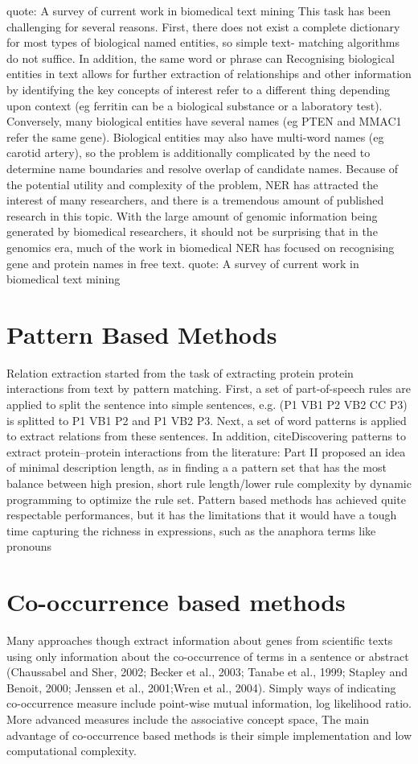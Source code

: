 quote: A survey of current work in biomedical text mining
This task has been challenging for several reasons. First, there does not exist a complete dictionary for most types of biological named entities, so simple text- matching algorithms do not suffice. In addition, the same word or phrase can
Recognising biological entities in text allows for further extraction of relationships and other information by identifying the key concepts of interest
refer to a different thing depending upon context (eg ferritin can be a biological substance or a laboratory test). Conversely, many biological entities have several names (eg PTEN and MMAC1 refer the same gene). Biological entities may also have multi-word names (eg carotid artery), so the problem is additionally complicated by the need to determine name boundaries and resolve overlap of candidate names.
Because of the potential utility and complexity of the problem, NER has attracted the interest of many researchers, and there is a tremendous amount of published research in this topic. With the large amount of genomic information being generated by biomedical researchers, it should not be surprising that in the genomics era, much of the work in biomedical NER has focused on recognising gene and protein names in free text.
quote: A survey of current work in biomedical text mining
\section{Pattern Based Methods}
Relation extraction started from the task of extracting protein protein interactions from text by pattern matching. 
First, a set of part-of-speech rules are applied to split the sentence into simple sentences, e.g. (P1 VB1 P2 VB2 CC P3) is splitted to P1 VB1 P2 and P1 VB2 P3. Next, a set of word patterns is applied to extract relations from these sentences. In addition, cite{Discovering patterns to extract protein–protein interactions
from the literature: Part II} proposed an idea of minimal description length, as in finding a a pattern set that has the most balance between high presion, short rule length/lower rule complexity by dynamic programming to optimize the rule set.  Pattern based methods has achieved quite respectable performances, but it has the limitations that it would have a tough time capturing the richness in expressions, such as the anaphora terms like pronouns 
\section{Co-occurrence based methods}%
Many approaches though extract information about genes from scientific texts using only information about the co-occurrence of terms in a sentence or abstract (Chaussabel and Sher, 2002; Becker et al., 2003; Tanabe et al., 1999; Stapley and Benoit, 2000; Jenssen et al., 2001;Wren et al., 2004). Simply ways of indicating co-occurrence measure include point-wise mutual information, log likelihood ratio. More advanced measures include the associative concept space,  The main advantage of co-occurrence based methods is their simple implementation and low computational complexity.


